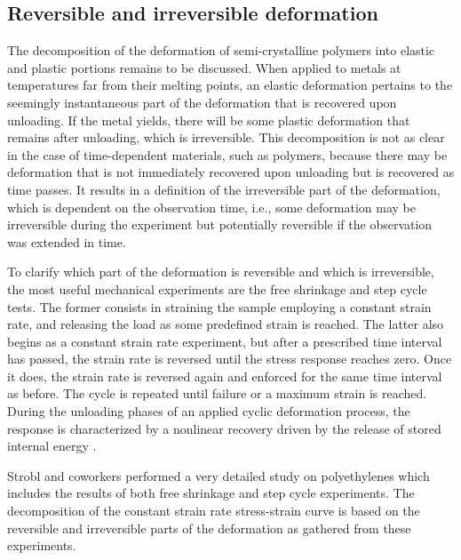 \subsection{Reversible and irreversible deformation}
\label{sec:reversible_and_irreversible_deformation}

The decomposition of the deformation of semi-crystalline polymers into elastic and plastic portions remains to be discussed.
When applied to metals at temperatures far from their melting points, an elastic deformation pertains to the seemingly instantaneous part of the deformation that is recovered upon unloading.
If the metal yields, there will be some plastic deformation that remains after unloading, which is irreversible.
This decomposition is not as clear in the case of time-dependent materials, such as polymers, because there may be deformation that is not immediately recovered upon unloading but is recovered as time passes.
It results in a definition of the irreversible part of the deformation, which is dependent on the observation time, i.e., some deformation may be irreversible during the experiment but potentially reversible if the observation was extended in time.

To clarify which part of the deformation is reversible and which is irreversible, the most useful mechanical experiments are the free shrinkage and step cycle tests.
The former consists in straining the sample employing a constant strain rate, and releasing the load as some predefined strain is reached.
The latter also begins as a constant strain rate experiment, but after a prescribed time interval has passed, the strain rate is reversed until the stress response reaches zero.
Once it does, the strain rate is reversed again and enforced for the same time interval as before.
The cycle is repeated until failure or a maximum strain is reached.
During the unloading phases of an applied cyclic deformation process, the response is characterized by a nonlinear recovery driven by the release of stored internal energy \citep{bergstromConstitutiveModelingUltrahigh2002}.

Strobl and coworkers \citep{hissNetworkStretchingSlip1999, hobeikaTemperatureStrainRate2000, hongModelTreatingTensile2004, hongModelTreatmentTensile2004, naViscousForceDominatedTensileDeformation2006} performed a very detailed study on polyethylenes which includes the results of both free shrinkage and step cycle experiments.
The decomposition of the constant strain rate stress-strain curve is based on the reversible and irreversible parts of the deformation as gathered from these experiments.

